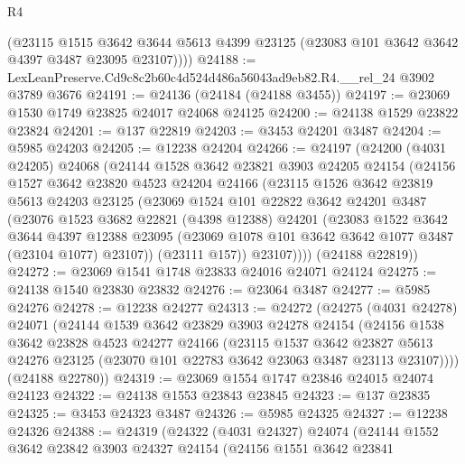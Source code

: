 \begin{lexlean}{R4}
\begin{coremodule}
        (@23115
          @1515
          @3642
          @3644
          @5613
          @4399
          @23125
          (@23083 @101 @3642 @3642 @4397 @3487 @23095 @23107))))
@24188 := LexLeanPreserve.Cd9c8c2b60c4d524d486a56043ad9eb82.R4.__rel_24 @3902 @3789 @3676
@24191 := @24136 (@24184 (@24188 @3455))
@24197 := @23069 @1530 @1749 @23825 @24017 @24068 @24125
@24200 := @24138 @1529 @23822 @23824
@24201 := @137 @22819
@24203 := @3453 @24201 @3487
@24204 := @5985 @24203
@24205 := @12238 @24204
@24266 := @24197
    (@24200
      (@4031 @24205)
      @24068
      (@24144
        @1528
        @3642
        @23821
        @3903
        @24205
        @24154
        (@24156
          @1527
          @3642
          @23820
          @4523
          @24204
          @24166
          (@23115
            @1526
            @3642
            @23819
            @5613
            @24203
            @23125
            (@23069
              @1524
              @101
              @22822
              @3642
              @24201
              @3487
              (@23076
                @1523
                @3682
                @22821
                (@4398 @12388)
                @24201
                (@23083
                  @1522
                  @3642
                  @3644
                  @4397
                  @12388
                  @23095
                  (@23069 @1078 @101 @3642 @3642 @1077 @3487 (@23104 @1077) @23107))
                (@23111 @157))
              @23107))))
      (@24188 @22819))
@24272 := @23069 @1541 @1748 @23833 @24016 @24071 @24124
@24275 := @24138 @1540 @23830 @23832
@24276 := @23064 @3487
@24277 := @5985 @24276
@24278 := @12238 @24277
@24313 := @24272
    (@24275
      (@4031 @24278)
      @24071
      (@24144
        @1539
        @3642
        @23829
        @3903
        @24278
        @24154
        (@24156
          @1538
          @3642
          @23828
          @4523
          @24277
          @24166
          (@23115
            @1537
            @3642
            @23827
            @5613
            @24276
            @23125
            (@23070 @101 @22783 @3642 @23063 @3487 @23113 @23107))))
      (@24188 @22780))
@24319 := @23069 @1554 @1747 @23846 @24015 @24074 @24123
@24322 := @24138 @1553 @23843 @23845
@24323 := @137 @23835
@24325 := @3453 @24323 @3487
@24326 := @5985 @24325
@24327 := @12238 @24326
@24388 := @24319
    (@24322
      (@4031 @24327)
      @24074
      (@24144
        @1552
        @3642
        @23842
        @3903
        @24327
        @24154
        (@24156
          @1551
          @3642
          @23841

\end{coremodule}
\end{lexlean}
